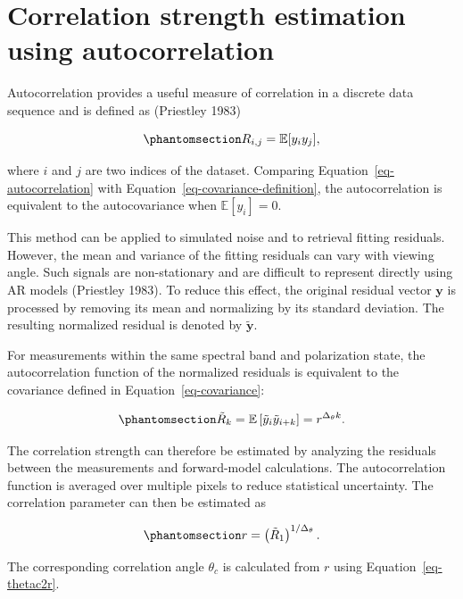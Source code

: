 \documentclass[
  letterpaper,
  open=any]{scrbook}
\begin{document}
\section{Correlation strength estimation using
autocorrelation}\label{sec-ac}

Autocorrelation provides a useful measure of correlation in a discrete
data sequence and is defined as (Priestley 1983)

\begin{equation}\phantomsection\label{eq-autocorrelation}{
R_{i,j}
=
\mathbb{E}[y_i y_j],
}\end{equation}

where \(i\) and \(j\) are two indices of the dataset. Comparing
Equation~\ref{eq-autocorrelation} with
Equation~\ref{eq-covariance-definition}, the autocorrelation is
equivalent to the autocovariance when \(\mathbb{E}[y_i]=0\).

This method can be applied to simulated noise and to retrieval fitting
residuals. However, the mean and variance of the fitting residuals can
vary with viewing angle. Such signals are non-stationary and are
difficult to represent directly using AR models (Priestley 1983). To
reduce this effect, the original residual vector \(\mathbf{y}\) is
processed by removing its mean and normalizing by its standard
deviation. The resulting normalized residual is denoted by
\(\tilde{\mathbf{y}}\).

For measurements within the same spectral band and polarization state,
the autocorrelation function of the normalized residuals is equivalent
to the covariance defined in Equation~\ref{eq-covariance}:

\begin{equation}\phantomsection\label{eq-rk}{
\tilde{R}_k
=
\mathbb{E}
\left[
\tilde{y}_i
\tilde{y}_{i+k}
\right]
=
r^{\Delta_\theta k}.
}\end{equation}

The correlation strength can therefore be estimated by analyzing the
residuals between the measurements and forward-model calculations. The
autocorrelation function is averaged over multiple pixels to reduce
statistical uncertainty. The correlation parameter can then be estimated
as

\begin{equation}\phantomsection\label{eq-r-from-ac}{
r
=
\left(\tilde{R}_1\right)^{1/\Delta_\theta}.
}\end{equation}

The corresponding correlation angle \(\theta_c\) is calculated from
\(r\) using Equation~\ref{eq-thetac2r}.
\end{document}
